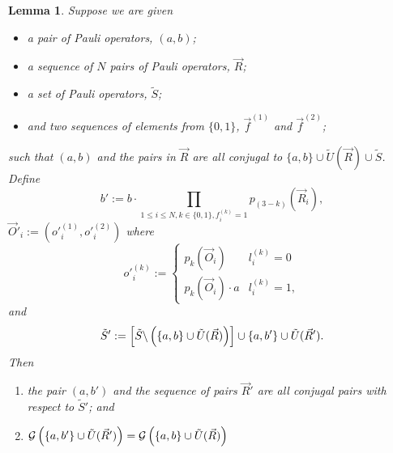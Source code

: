 \documentclass[twocolumn,showpacs,preprintnumbers,amsmath,amssymb,nofootinbib,pra,floatfix]{revtex4-1}
\newtheorem{lemma}{Lemma}
\newcommand{\lst}{\vec}
\newcommand{\set}{\tilde}
\newcommand{\genfun}{\mathcal{G}}
\begin{document}
\begin{lemma}
\label{multiple-recombinations}
Suppose we are given
\begin{itemize}
\item a pair of Pauli operators, $(a,b)$;
\item a sequence of $N$ pairs of Pauli operators, $\lst R$;
\item a set of Pauli operators, $\set S$;
\item and two sequences of elements from $\{0,1\}$, $\lst f^{(1)}$ and $\lst f^{(2)}$;
\end{itemize}
such that $(a,b)$ and the pairs in $\lst R$ are all conjugal to $\{a,b\}\cup\set U(\lst R)\cup\set S$.  Define
$$b':=b\cdot\prod_{1 \le i \le N, k \in \{0,1\}, f^{(k)}_i=1}p_{(3-k)}(\lst R_i),$$
$\lst O'_i := (o'^{(1)}_i,o'^{(2)}_i)$ where
$$o'^{(k)}_i :=
\begin{cases}
p_k(\lst O_i) & l^{(k)}_i = 0\\
p_k(\lst O_i) \cdot a & l^{(k)}_i = 1,
\end{cases}
$$
and
$$\set S' := \left[\set S\backslash\paren{\{a,b\} \cup \set U(\lst R)}\right]\cup \{a,b'\} \cup \set U(\lst R').$$
Then
\begin{enumerate}
\item the pair $(a,b')$ and the sequence of pairs $\lst R'$ are all conjugal pairs with respect to $\set S'$; and
\item $\genfun\paren{\{a,b'\}\cup \set U(\lst R')}=\genfun\paren{\{a,b\}\cup \set U(\lst R)}$
\end{enumerate}
\end{lemma}
\end{document}

